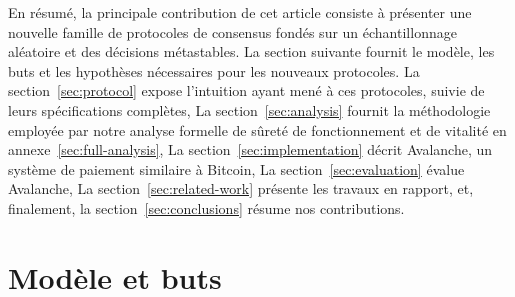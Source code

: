 \documentclass[letterpaper,twocolumn,10pt]{article}
\newcommand{\editchange}[1]{{\color{orange}#1}}
\theoremstyle{definition}
\begin{document}
En résumé, la principale contribution de cet article consiste à présenter une nouvelle famille de protocoles de consensus fondés sur un échantillonnage aléatoire et des décisions métastables.
La section suivante fournit le modèle, les buts et les hypothèses nécessaires pour les nouveaux protocoles.
La section~\ref{sec:protocol} expose l'intuition ayant mené à ces protocoles, suivie de leurs spécifications complètes,
La section~\ref{sec:analysis} fournit la méthodologie employée par notre analyse formelle de sûreté de fonctionnement et de vitalité en annexe~\ref{sec:full-analysis},
La section~\ref{sec:implementation} décrit Avalanche, un système de paiement similaire à Bitcoin,
La section~\ref{sec:evaluation} évalue Avalanche,
La section~\ref{sec:related-work} présente les travaux en rapport, et, finalement, la section~\ref{sec:conclusions} résume nos contributions.

\section{Modèle et buts}
\label{sec:model_and_goals}
\end{document}
